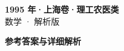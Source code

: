 \documentclass[zihao=-4, a4paper]{ctexart}
\begin{document}
\begin{center}
  {\Large\bfseries 1995 年·上海卷·理工农医类}\\[4pt]
  {\large 数学 · 解析版}
\end{center}
\medskip
{}

\clearpage
{}
\begin{center}{\Large\bfseries 参考答案与详细解析}\end{center}
\medskip

\end{document}
